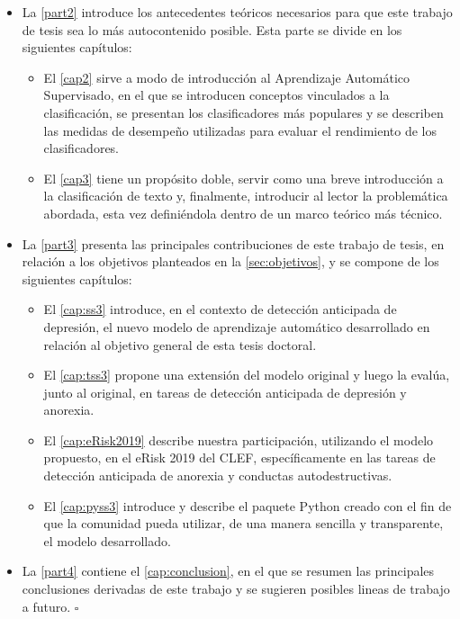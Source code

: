 \begin{itemize}
    \item La \autoref{part2} introduce los antecedentes teóricos necesarios para que este trabajo de tesis sea lo más autocontenido  posible. Esta parte se divide en los siguientes capítulos:
    \begin{itemize}
        \item El \autoref{cap2} sirve a modo de introducción al Aprendizaje Automático Supervisado, en el que se introducen conceptos vinculados a la clasificación, se presentan los clasificadores más populares y se describen las medidas de desempeño utilizadas para evaluar el rendimiento de los clasificadores.
        \item El \autoref{cap3} tiene un propósito doble, servir como una breve introducción a la clasificación de texto y, finalmente, introducir al lector la problemática abordada, esta vez definiéndola dentro de un marco teórico más técnico.
    \end{itemize}
    \item La \autoref{part3} presenta las principales contribuciones de este trabajo de tesis, en relación a los objetivos planteados en la \autoref{sec:objetivos}, y se compone de los siguientes capítulos:
    \begin{itemize}
        \item El \autoref{cap:ss3} introduce, en el contexto de detección anticipada de depresión, el nuevo modelo de aprendizaje automático desarrollado en relación al objetivo general de esta tesis doctoral.
        \item El \autoref{cap:tss3} propone una extensión del modelo original y luego la evalúa, junto al original, en tareas de detección anticipada de depresión y anorexia.
        \item El \autoref{cap:eRisk2019} describe nuestra participación, utilizando el modelo propuesto, en el eRisk 2019 del CLEF, específicamente en las tareas de detección anticipada de anorexia y conductas autodestructivas.
        \item El \autoref{cap:pyss3} introduce y describe el paquete Python creado con el fin de que la comunidad pueda utilizar, de una manera sencilla y transparente, el modelo desarrollado.
    \end{itemize}
    \item La \autoref{part4} contiene el \autoref{cap:conclusion}, en el que se resumen las principales conclusiones derivadas de este trabajo y se sugieren posibles lineas de trabajo a futuro.
    \hfill$\square$
\end{itemize}
